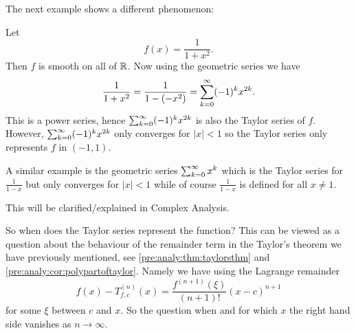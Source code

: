 \documentclass[10pt, a4paper]{article}
\begin{document}
The next example shows a different phenomenon:
\begin{example}
    Let
    \[
    f(x) = \frac{1}{1 + x ^ 2}.
    \]
    Then $f$ is smooth on all of $\mathbb{R}$.
    Now using the geometric series we have
    \[
    \frac{1}{1 + x ^ 2} = \frac{1}{1 - (-x ^ 2)} = \sum_{k = 0}^{\infty}(-1) ^ kx ^ {2k}.
    \]
    This is a power series,
    hence $\sum_{k = 0}^{\infty}(-1) ^ k x ^ {2k}$ is also the Taylor series of $f$.
    However,
    $\sum_{k = 0}^{\infty}(-1) ^ kx ^ {2k}$ only converges for $|x| < 1$ so the Taylor series only represents $f$ in $(-1, 1)$.

    A similar example is the geometric series $\sum_{k = 0}^{\infty} x ^ k$ which is the Taylor series for $\frac{1}{1 - x}$ but only converges for $|x| < 1$ while of course $\frac{1}{1 - x}$ is defined for all $x \neq 1$.

    This will be clarified/explained in Complex Analysis.
\end{example}

So when does the Taylor series represent the function?
This can be viewed as a question about the behaviour of the remainder term in the Taylor's theorem we have previously mentioned,
see \autoref{pre:analy:thm:taylorsthm} and \autoref{pre:analy:cor:polypartoftaylor}.
Namely we have using the Lagrange remainder
\[
f(x) - T_{f, c} ^ {(n)}(x) = \frac{f ^ {(n + 1)}(\xi)}{(n + 1)!}(x - c) ^ {n + 1}
\]
for some $\xi$ between $c$ and $x$.
So the question when and for which $x$ the right hand side vanishes as $n \rightarrow \infty$.
\end{document}

